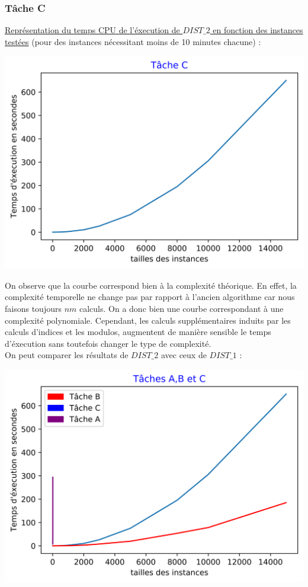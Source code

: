 \documentclass[12pt, a4paper]{report}
\begin{document}
\subsubsection{Tâche C}
\underline{Représentation du temps CPU de l'éxecution de $DIST\_2$ en fonction des instances testées} (pour des instances nécessitant moins de 10 minutes chacune) :\\
\begin{center}
\includegraphics[scale=0.75]{TC.png}
\end{center}
On observe que la courbe correspond bien à la complexité théorique. En effet, la complexité temporelle ne change pas par rapport à l'ancien algorithme car nous faisons toujours $nm$ calculs. On a donc bien une courbe correspondant à une complexité polynomiale. Cependant, les calculs supplémentaires induits par les calculs d'indices et les modulos, augmentent de manière sensible le temps d'éxecution sans toutefois changer le type de complexité.\\
On peut comparer les résultats de $DIST\_2$ avec ceux de $DIST\_1$ :
\begin{center}
\includegraphics[scale=0.75]{TC2.png}
\end{center}
\end{document}
